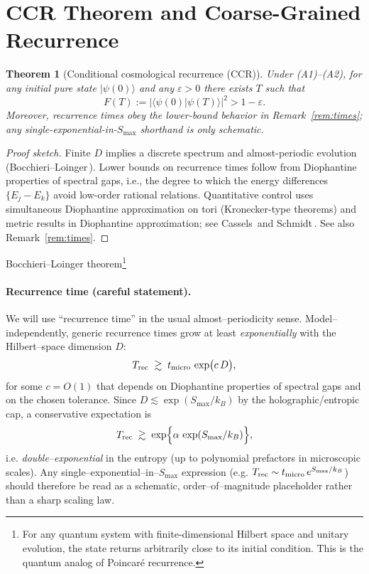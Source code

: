 \documentclass[12pt]{article}
\newtheorem{theorem}{Theorem}
\theoremstyle{remark}
\begin{document}
\section{CCR Theorem and Coarse-Grained Recurrence}
\begin{theorem}[Conditional cosmological recurrence (CCR)]\label{thm:CCR}
Under (A1)--(A2), for any initial pure state $|\psi(0)\rangle$ and any $\varepsilon>0$ there exists $T$ such that
\begin{equation}
 F(T):=|\langle\psi(0)|\psi(T)\rangle|^2 > 1-\varepsilon.
\end{equation}
Moreover, recurrence times obey the lower-bound behavior in Remark~\ref{rem:times}; any single-exponential-in-$S_{\max}$ shorthand is only schematic.
\end{theorem}
\begin{proof}[Proof sketch]
Finite $D$ implies a discrete spectrum and almost-periodic evolution (Bocchieri--Loinger\,\cite{BocchieriLoinger1957}). 
Lower bounds on recurrence times follow from Diophantine properties of spectral gaps, i.e., the degree to which the energy differences $\{E_j{-}E_k\}$ avoid low-order rational relations. Quantitative control uses simultaneous Diophantine approximation on tori (Kronecker-type theorems) and metric results in Diophantine approximation; see Cassels\,\cite{Cassels1957} and Schmidt\,\cite{Schmidt1980}. See also Remark~\ref{rem:times}.
\end{proof}

Bocchieri--Loinger theorem\footnote{For any quantum system with finite-dimensional Hilbert space 
and unitary evolution, the state returns arbitrarily close to its initial condition. 
This is the quantum analog of Poincaré recurrence.}



\paragraph{Recurrence time (careful statement).}
We will use “recurrence time” in the usual almost–periodicity sense. Model–independently, generic recurrence times grow at least \emph{exponentially} with the Hilbert–space dimension $D$:
\[
T_{\rm rec} \;\gtrsim\; t_{\rm micro}\,\exp\!\big(c\,D\big),
\]
for some $c=O(1)$ that depends on Diophantine properties of spectral gaps and on the chosen tolerance.
Since $D \lesssim \exp(S_{\max}/k_B)$ by the holographic/entropic cap, a conservative expectation is
\[
T_{\rm rec} \;\gtrsim\; \exp\!\Big\{\alpha\,\exp(S_{\max}/k_B)\Big\},
\]
i.e. \emph{double–exponential} in the entropy (up to polynomial prefactors in microscopic scales).
Any single–exponential–in–$S_{\max}$ expression (e.g. $T_{\rm rec}\sim t_{\rm micro}\,e^{S_{\max}/k_B}$) should therefore be read as a schematic, order–of–magnitude placeholder rather than a sharp scaling law.
\end{document}
